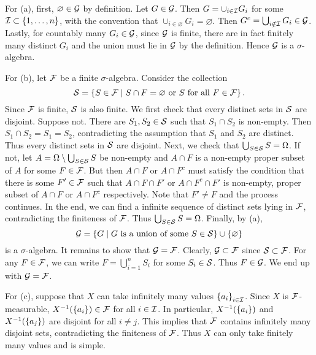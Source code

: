 \begin{solution}
    For (a), first, $\varnothing\in\G$ by definition. Let $G\in\G$. Then $G = 
    \cup_{i\in\I}G_i$ for some $\I\subset\set{1,\ldots,n}$, with the convention that 
    $\cup_{i\in\varnothing}G_i = \varnothing$. Then $G^c = \bigcup_{i\notin\I}G_i\in\G$. 
    Lastly, for countably many $G_i\in\G$, since $\G$ is finite, there are in fact 
    finitely many distinct $G_i$ and the union must lie in $\G$ by the definition. 
    Hence $\G$ is a $\sigma$-algebra. 

    For (b), let $\F$ be a finite $\sigma$-algebra. Consider the collection 
    \begin{equation*}
        \S = \Set{S\in\F}{\text{$S\cap F = \varnothing$ or $S$ for all $F\in\F$}}.
    \end{equation*}
    Since $\F$ is finite, $\S$ is also finite. We first check that every distinct 
    sets in $\S$ are disjoint. Suppose not. There are $S_1, S_2\in\S$ such that 
    $S_1\cap S_2$ is non-empty. Then $S_1\cap S_2 = S_1 = S_2$, contradicting the 
    assumption that $S_1$ and $S_2$ are distinct. Thus every distinct sets in 
    $\S$ are disjoint. Next, we check that $\bigcup_{S\in\S} S = \Omega$. If not, 
    let $A = \Omega\setminus\bigcup_{S\in\S} S$ be non-empty and $A\cap F$ is a 
    non-empty proper subset of $A$ for some $F\in\F$. But then $A\cap F$ or 
    $A\cap F^c$ must satisfy the condition that there is some $F'\in\F$ such that
    $A\cap F\cap F'$ or $A\cap F^c\cap F'$ is non-empty, proper subset of 
    $A\cap F$ or $A\cap F^c$ respectively. Note that $F'\neq F$ and the process 
    continues. In the end, we can find a infinite sequence of distinct sets lying 
    in $\F$, contradicting the finiteness of $\F$. Thus $\bigcup_{S\in\S} S = \Omega$.
    Finally, by (a),
    \begin{equation*}
        \G = \Set{G}{G\text{ is a union of some } S\in\S}\cup\set{\varnothing}
    \end{equation*}
    is a $\sigma$-algebra. It remains to show that $\G = \F$. Clearly, $\G\subset\F$ since 
    $\S\subset\F$. For any $F\in\F$, we can write $F = \bigcup_{i=1}^n S_i$ for some 
    $S_i\in\S$. Thus $F\in\G$. We end up with $\G = \F$. 
    
    For (c), suppose that $X$ can take infinitely many values $\set{a_i}_{i\in\I}$. 
    Since $X$ is $\F$-measurable, $X^{-1}(\set{a_i})\in\F$ for all $i\in\I$. In particular, 
    $X^{-1}(\set{a_i})$ and $X^{-1}(\set{a_j})$ are disjoint for all $i\neq j$. This 
    implies that $\F$ contains infinitely many disjoint sets, contradicting the 
    finiteness of $\F$. Thus $X$ can only take finitely many values and is simple. 
\end{solution}

